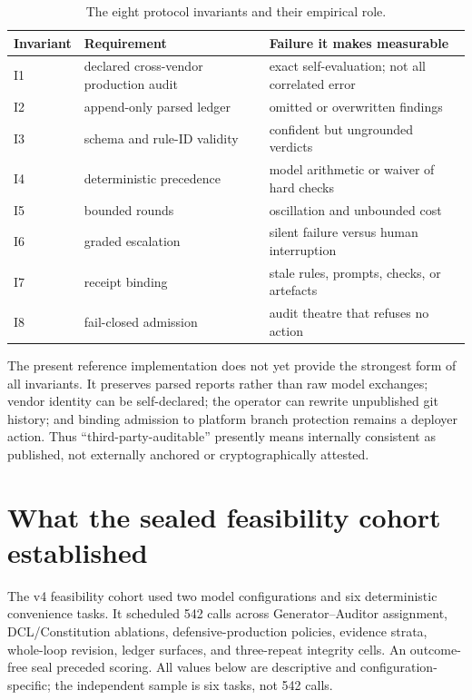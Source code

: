 \documentclass[10pt]{article}
\begin{document}
\begin{table}[t]
\centering\small\setlength{\tabcolsep}{4pt}
\caption{The eight protocol invariants and their empirical role.}
\label{tab:invariants}
\begin{tabular}{@{}p{13mm}p{47mm}p{59mm}@{}}
\toprule
Invariant & Requirement & Failure it makes measurable \\
\midrule
I1 & declared cross-vendor production audit & exact self-evaluation; not all correlated error \\
I2 & append-only parsed ledger & omitted or overwritten findings \\
I3 & schema and rule-ID validity & confident but ungrounded verdicts \\
I4 & deterministic precedence & model arithmetic or waiver of hard checks \\
I5 & bounded rounds & oscillation and unbounded cost \\
I6 & graded escalation & silent failure versus human interruption \\
I7 & receipt binding & stale rules, prompts, checks, or artefacts \\
I8 & fail-closed admission & audit theatre that refuses no action \\
\bottomrule
\end{tabular}
\end{table}

The present reference implementation does not yet provide the strongest form
of all invariants. It preserves parsed reports rather than raw model exchanges;
vendor identity can be self-declared; the operator can rewrite unpublished git
history; and binding admission to platform branch protection remains a deployer
action. Thus ``third-party-auditable'' presently means internally consistent as
published, not externally anchored or cryptographically attested.

\section{What the sealed feasibility cohort established}

The v4 feasibility cohort used two model configurations and six deterministic
convenience tasks. It scheduled 542 calls across Generator--Auditor assignment,
DCL/Constitution ablations, defensive-production policies, evidence strata,
whole-loop revision, ledger surfaces, and three-repeat integrity cells. An
outcome-free seal preceded scoring. All values below are descriptive and
configuration-specific; the independent sample is six tasks, not 542 calls.
\end{document}
